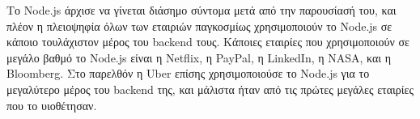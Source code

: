\documentclass[../thesis.tex]{subfiles}
\begin{document}
Το Node.js άρχισε να γίνεται διάσημο σύντομα μετά από την παρουσίασή του, και πλέον η πλειοψηφία όλων των εταιριών παγκοσμίως χρησιμοποιούν το Node.js σε κάποιο τουλάχιστον μέρος του backend τους.
Κάποιες εταιρίες που χρησιμοποιούν σε μεγάλο βαθμό το Node.js είναι η Netflix\cite{netflix}, η PayPal\cite{paypal}, η LinkedIn\cite{linkedIn}, η NASA\cite{nasa}, και η Bloomberg\cite{bloomberg}.
Στο παρελθόν η Uber επίσης χρησιμοποιούσε το Node.js για το μεγαλύτερο μέρος του backend της, και μάλιστα ήταν από τις πρώτες μεγάλες εταιρίες που το υιοθέτησαν\cite{uberNode}.
\end{document}
